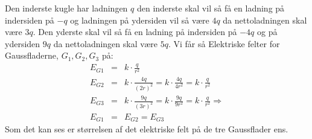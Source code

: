 Den inderste kugle har ladningen $q$ den inderste skal vil så få en ladning på indersiden på $-q$ og ladningen på ydersiden vil så være $4q$ da nettoladningen skal være $3q$. Den yderste skal vil så få en ladning på indersiden på $-4q$ og på ydersiden $9q$ da nettoladningen skal være $5q$. Vi får så Elektriske felter for Gaussfladerne, $G_1, G_2, G_3$ på:
\begin{eqnarray}
	E_{G1} &=& k \cdot \frac{q}{r^2} \nonumber \\
	E_{G2} &=& k \cdot \frac{4q}{(2r)^2} = k \cdot \frac{4q}{4r^2} = k \cdot \frac{q}{r^2} \nonumber \\
	E_{G3} &=& k \cdot \frac{9q}{(3r)^2} = k \cdot \frac{9q}{9r^2} = k \cdot \frac{q}{r^2} \nonumber \Rightarrow \\
	E_{G1} &=& E_{G2} = E_{G3}
\end{eqnarray}
Som det kan ses er størrelsen af det elektriske felt på de tre Gaussflader ens.
